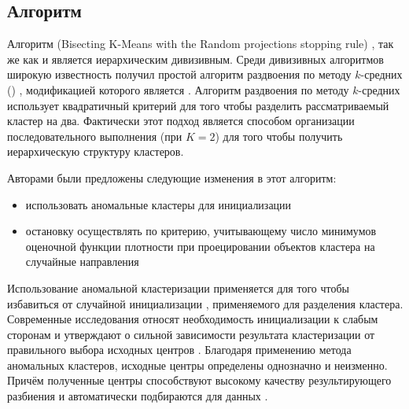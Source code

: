 \documentclass[12pt]{diploma}
\begin{document}
	\subsection{Алгоритм \BiKMR} \label{subsec:bikmr}
	Алгоритм \BiKMR (Bisecting \mbox{K-Means} with the Random projections stopping rule) \cite{kovaleva}, так же как и \dePDDP является иерархическим дивизивным. Среди дивизивных алгоритмов широкую известность получил простой алгоритм раздвоения по методу $ k $-средних (\BisectingKmeans) \cite{bisecting-k-means}, модификацией которого является \BiKMR. Алгоритм раздвоения по методу $ k $-средних использует квадратичный критерий для того чтобы разделить рассматриваемый кластер на два. Фактически этот подход является способом организации последовательного выполнения \kmeans (при $ K=2 $) для того чтобы получить иерархическую структуру кластеров. 
	
	Авторами \cite{kovaleva} были предложены следующие изменения в этот алгоритм: 
	\begin{itemize}
		\item использовать аномальные кластеры для инициализации \kmeans
		\item остановку осуществлять по критерию, учитывающему число минимумов оценочной функции плотности при проецировании объектов кластера на случайные направления
	\end{itemize}
	
	Использование аномальной кластеризации применяется для того чтобы избавиться от случайной инициализации \kmeans, применяемого для разделения кластера. Современные исследования относят необходимость инициализации к слабым сторонам \kmeans и утверждают о сильной зависимости результата кластеризации от правильного выбора исходных центров \cite{mirkin-core-concepts}. Благодаря применению метода аномальных кластеров, исходные центры определены однозначно и неизменно. Причём полученные центры способствуют высокому качеству результирующего разбиения и автоматически подбираются для данных \cite{mirkin-ds}. 
	
\end{document}
